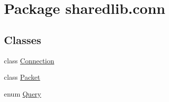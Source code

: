 \hypertarget{namespacesharedlib_1_1conn}{}\section{Package sharedlib.\+conn}
\label{namespacesharedlib_1_1conn}
\subsection*{Classes}
\begin{DoxyCompactItemize}
\item 
class \hyperlink{classsharedlib_1_1conn_1_1_connection}{Connection}
\item 
class \hyperlink{classsharedlib_1_1conn_1_1_packet}{Packet}
\item 
enum \hyperlink{enumsharedlib_1_1conn_1_1_query}{Query}
\end{DoxyCompactItemize}
